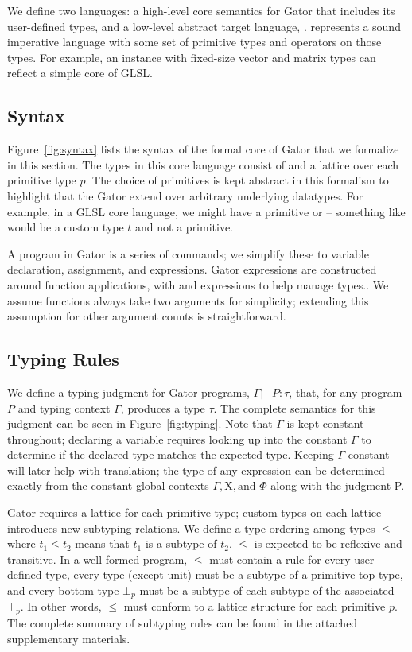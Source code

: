 \documentclass[../main.tex]{subfiles}
\begin{document}
We define two languages: a high-level core semantics for Gator that includes its user-defined types, and a low-level abstract target language, \targlang.  \targlang represents a sound imperative language with some set of primitive types and operators on those types.
For example, an instance with fixed-size vector and matrix types can reflect a simple core of GLSL.

\subsection{Syntax}

Figure~\ref{fig:syntax} lists the syntax of the formal core of Gator that we formalize in this section.
The types in this core language consist of  and a lattice over each primitive type $p$.
The choice of primitives is kept abstract in this formalism to highlight that the Gator extend over arbitrary underlying datatypes.
For example, in a GLSL core language, we might have a primitive  or  -- something like  would be a custom type $t$ and not a primitive.

A program in Gator is a series of commands; we simplify these to variable declaration, assignment, and expressions.
Gator expressions are constructed around function applications, with  and  expressions to help manage types..
We assume functions always take two arguments for simplicity; extending this assumption for other argument counts is straightforward.


\subsection{Typing Rules}
\label{subsec:order}

We define a typing judgment for Gator programs, $\Gamma |- P : \tau$, that, for any program $P$ and typing context $\Gamma$, produces a type $\tau$.  The complete semantics for this judgment can be seen in Figure~\ref{fig:typing}.  
Note that $\Gamma$ is kept constant throughout; declaring a variable requires looking up into the constant $\Gamma$ to determine if the declared type matches the expected type.
Keeping $\Gamma$ constant will later help with translation; the type of any expression can be determined exactly from the constant global contexts $\Gamma,\mathrm{X},\text{and }\Phi$ along with the judgment \textrm{P}.

Gator requires a lattice for each primitive type; custom types on each lattice introduces new subtyping relations.
We define a type ordering among types $\leq$ where $t_1 \leq t_2$ means that $t_1$ is a subtype of $t_2$.
$\leq$ is expected to be reflexive and transitive.
In a well formed program, $\leq$ must contain a rule for every user defined type, every type (except unit) must be a subtype of a primitive top type, and every bottom type $\bot_p$ must be a subtype of each subtype of the associated $\top_p$.
In other words, $\leq$ must conform to a lattice structure for each primitive $p$.
The complete summary of subtyping rules can be found in the attached supplementary materials.
\end{document}
